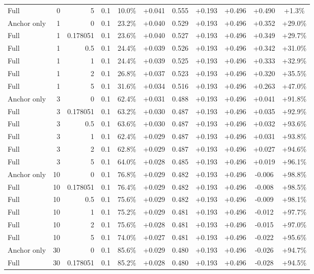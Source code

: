 \begin{table}[htbp]
\begin{tabular}{lrrrccccccc}
Full & 0 & 5 & 0.1 & 10.0\% & +0.041 & 0.555 & +0.193 & +0.496 & +0.490 & +1.3\% \\
Anchor only & 1 & 0 & 0.1 & 23.2\% & +0.040 & 0.529 & +0.193 & +0.496 & +0.352 & +29.0\% \\
Full & 1 & 0.178051 & 0.1 & 23.6\% & +0.040 & 0.527 & +0.193 & +0.496 & +0.349 & +29.7\% \\
Full & 1 & 0.5 & 0.1 & 24.4\% & +0.039 & 0.526 & +0.193 & +0.496 & +0.342 & +31.0\% \\
Full & 1 & 1 & 0.1 & 24.4\% & +0.039 & 0.525 & +0.193 & +0.496 & +0.333 & +32.9\% \\
Full & 1 & 2 & 0.1 & 26.8\% & +0.037 & 0.523 & +0.193 & +0.496 & +0.320 & +35.5\% \\
Full & 1 & 5 & 0.1 & 31.6\% & +0.034 & 0.516 & +0.193 & +0.496 & +0.263 & +47.0\% \\
Anchor only & 3 & 0 & 0.1 & 62.4\% & +0.031 & 0.488 & +0.193 & +0.496 & +0.041 & +91.8\% \\
Full & 3 & 0.178051 & 0.1 & 63.2\% & +0.030 & 0.487 & +0.193 & +0.496 & +0.035 & +92.9\% \\
Full & 3 & 0.5 & 0.1 & 63.6\% & +0.030 & 0.487 & +0.193 & +0.496 & +0.032 & +93.6\% \\
Full & 3 & 1 & 0.1 & 62.4\% & +0.029 & 0.487 & +0.193 & +0.496 & +0.031 & +93.8\% \\
Full & 3 & 2 & 0.1 & 62.8\% & +0.029 & 0.487 & +0.193 & +0.496 & +0.027 & +94.6\% \\
Full & 3 & 5 & 0.1 & 64.0\% & +0.028 & 0.485 & +0.193 & +0.496 & +0.019 & +96.1\% \\
Anchor only & 10 & 0 & 0.1 & 76.8\% & +0.029 & 0.482 & +0.193 & +0.496 & -0.006 & +98.8\% \\
Full & 10 & 0.178051 & 0.1 & 76.4\% & +0.029 & 0.482 & +0.193 & +0.496 & -0.008 & +98.5\% \\
Full & 10 & 0.5 & 0.1 & 75.6\% & +0.029 & 0.482 & +0.193 & +0.496 & -0.009 & +98.1\% \\
Full & 10 & 1 & 0.1 & 75.2\% & +0.029 & 0.481 & +0.193 & +0.496 & -0.012 & +97.7\% \\
Full & 10 & 2 & 0.1 & 75.6\% & +0.028 & 0.481 & +0.193 & +0.496 & -0.015 & +97.0\% \\
Full & 10 & 5 & 0.1 & 74.0\% & +0.027 & 0.481 & +0.193 & +0.496 & -0.022 & +95.6\% \\
Anchor only & 30 & 0 & 0.1 & 85.6\% & +0.029 & 0.480 & +0.193 & +0.496 & -0.026 & +94.7\% \\
Full & 30 & 0.178051 & 0.1 & 85.2\% & +0.028 & 0.480 & +0.193 & +0.496 & -0.028 & +94.5\% \\

\end{tabular}
\end{table}
